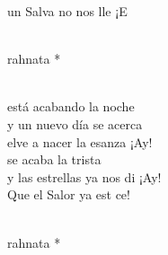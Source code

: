 \begin{cancion}
	 un Salva no nos lle ¡E\\\jump\\
	\begin{chorus}%
	rahnata *\\
	\end{chorus}%
	\jump\\
	 está acabando la noche\\
y un nuevo día se acerca\\
	elve a nacer la esanza ¡Ay!\\
	se acaba la trista\\
	y las estrellas ya nos di ¡Ay!\\
	Que el Salor ya est ce!\\\jump\\
	\begin{chorus}%
	rahnata *\\
	\end{chorus}%
	\jump\\
\end{cancion}%
